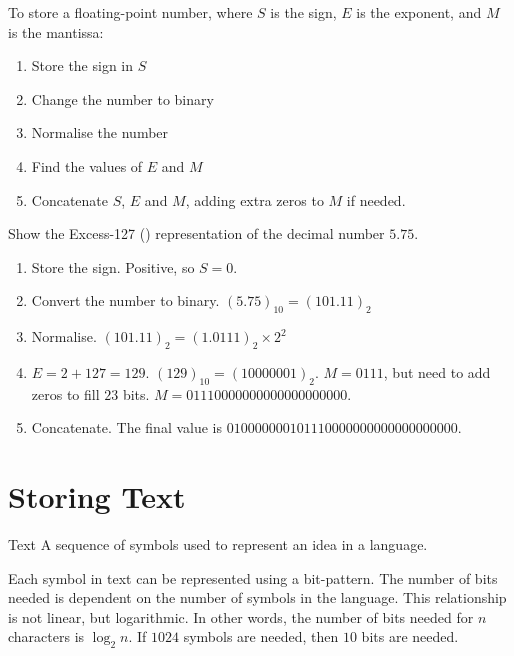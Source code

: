 \documentclass[\main/notes.tex]{subfiles}
\begin{document}
				To store a floating-point number, where $S$ is the sign, $E$ is the exponent, and $M$ is the mantissa:
				\begin{enumerate}[nosep]
					\item Store the sign in $S$
					\item Change the number to binary
					\item Normalise the number
					\item Find the values of $E$ and $M$
					\item Concatenate $S$, $E$ and $M$, adding extra zeros to $M$ if needed.
				\end{enumerate}
				\pagebreak
				\begin{example}
					Show the Excess-127 () representation of the decimal number $5.75$.
					\begin{enumerate}
						\item Store the sign. Positive, so $S = 0$.
						\item Convert the number to binary. $(5.75)_{10} = (101.11)_{2}$
						\item Normalise. $(101.11)_{2} = (1.0111)_{2} \times 2^{2}$
						\item $E = 2 + 127 = 129$. $(129)_{10} = (10000001)_{2}$. $M = 0111$, but need to add zeros to fill $23$ bits. $M = 01110000000000000000000$.
						\item Concatenate. The final value is $010000000101110000000000000000000$.
					\end{enumerate}
				\end{example}
		\section{Storing Text}
			\begin{definition}{Text}
				A sequence of symbols used to represent an idea in a language.
			\end{definition}
			Each symbol in text can be represented using a bit-pattern. The number of bits needed is dependent on the number of symbols in the language. This relationship is not linear, but logarithmic. In other words, the number of bits needed for $n$ characters is $\log_{2}n$. If $1024$ symbols are needed, then $10$ bits are needed.
\end{document}
